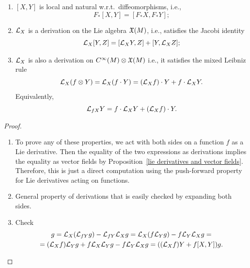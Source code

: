 \begin{prop}\label{prop properties of Lie derivatives}
\begin{enumerate}
    \item $[X,Y]$ is local and natural w.r.t.\ diffeomorphisms, i.e., \[F_\ast [X,Y]=[F_\ast X,F_\ast Y];\]
    \item $\mathcal{L}_X$ is a derivation on the Lie algebra $\mathfrak{X}(M)$, i.e., satisfies the Jacobi identity
    \[\mathcal{L}_X [Y,Z]=[\mathcal{L}_X Y,Z]+[Y,\mathcal{L}_X Z];\]
    \item $\mathcal{L}_X$ is also a derivation on $C^\infty(M)\otimes \mathfrak{X}(M)$ i.e., it satisfies the mixed Leibniz rule
    \[\mathcal{L}_X(f\otimes Y)=\mathcal{L}_X(f\cdot Y)=(\mathcal{L}_X f)\cdot Y+f\cdot \mathcal{L}_X Y.\]
    Equivalently, 
    \[\mathcal{L}_{fX}Y=f\cdot \mathcal{L}_X Y+\left(\mathcal{L}_X f\right)\cdot Y.\label{Lie derivative not covariant}\]
\end{enumerate}
\end{prop}
\begin{proof}
    \begin{enumerate}
        \item To prove any of these properties, we act with both sides on a function $f$ as a Lie derivative. Then the equality of the two expressions as derivations implies the equality as vector fields by Proposition~\ref{lie derivatives and vector fields}. Therefore, this is just a direct computation using the push-forward property for Lie derivatives acting on functions.
        \item General property of derivations that is easily checked by expanding both sides.
        \item Check 
        \begin{multline}
            [X,fY]g=\Lie_X (\Lie_{fY}g)-\Lie_{fY}\Lie_X g=\Lie_X (f\Lie_Y g)-f\Lie_Y \Lie_X g=\\=(\Lie_X f)\Lie_Y g+f\Lie_X\Lie_Y g-f\Lie_Y\Lie_X g=((\Lie_X f)Y+f[X,Y])g.
        \end{multline}
    \end{enumerate}
\end{proof}


